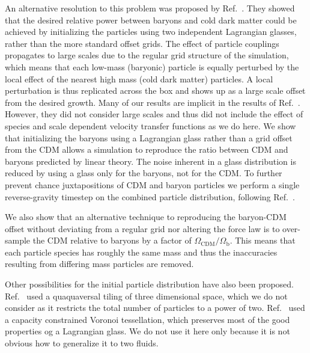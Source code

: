 \documentclass[a4paper,11pt]{article}
\begin{document}
An alternative resolution to this problem was proposed by Ref.~\cite{Yoshida:2003}. They showed that the desired relative power between baryons and cold dark matter could be achieved by initializing the particles using two independent Lagrangian glasses, rather than the more standard offset grids. The effect of particle couplings propagates to large scales due to the regular grid structure of the simulation, which means that each low-mass (baryonic) particle is equally perturbed by the local effect of the nearest high mass (cold dark matter) particles. A local perturbation is thus replicated across the box and shows up as a large scale offset from the desired growth. Many of our results are implicit in the results of Ref.~\cite{Yoshida:2003}. However, they did not consider large scales and thus did not include the effect of species and scale dependent velocity transfer functions as we do here.
We show that initializing the baryons using a Lagrangian glass rather than a grid offset from the CDM allows a simulation to reproduce the ratio between CDM and baryons predicted by linear theory. The noise inherent in a glass distribution is reduced by using a glass only for the baryons, not for the CDM. To further prevent chance juxtapositions of CDM and baryon particles we perform a single reverse-gravity timestep on the combined particle distribution, following Ref.~\cite{Yoshida:2003}.

We also show that an alternative technique to reproducing the baryon-CDM offset without deviating from a regular grid nor altering the force law is to over-sample the CDM relative to baryons by a factor of $\Omega_\mathrm{CDM}/\Omega_\mathrm{b}$. This means that each particle species has roughly the same mass and thus the inaccuracies resulting from differing mass particles are removed.

Other possibilities for the initial particle distribution have also been proposed. Ref.~\cite{Hansen:2007} used a quaquaversal tiling of three dimensional space, which we do not consider as it restricts the total number of particles to a power of two. Ref.~\cite{Liao:2018} used a capacity constrained Voronoi tessellation, which preserves most of the good properties og a Lagrangian glass. We do not use it here only because it is not obvious how to generalize it to two fluids.

\end{document}
